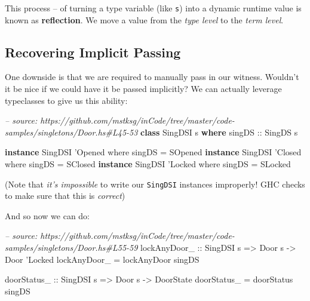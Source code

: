 \documentclass[]{article}
\newenvironment{Shaded}{\begin{snugshade}}{\end{snugshade}}
\newcommand{\CharTok}[1]{\textcolor[rgb]{0.31,0.60,0.02}{#1}}
\newcommand{\CommentTok}[1]{\textcolor[rgb]{0.56,0.35,0.01}{\textit{#1}}}
\newcommand{\DataTypeTok}[1]{\textcolor[rgb]{0.13,0.29,0.53}{#1}}
\newcommand{\FunctionTok}[1]{\textcolor[rgb]{0.00,0.00,0.00}{#1}}
\newcommand{\KeywordTok}[1]{\textcolor[rgb]{0.13,0.29,0.53}{\textbf{#1}}}
\newcommand{\NormalTok}[1]{#1}
\newcommand{\OtherTok}[1]{\textcolor[rgb]{0.56,0.35,0.01}{#1}}
\begin{document}
This process -- of turning a type variable (like \texttt{s}) into a dynamic
runtime value is known as \textbf{reflection}. We move a value from the
\emph{type level} to the \emph{term level}.

\hypertarget{recovering-implicit-passing}{%
\subsection{Recovering Implicit Passing}\label{recovering-implicit-passing}}

One downside is that we are required to manually pass in our witness. Wouldn't
it be nice if we could have it be passed implicitly? We can actually leverage
typeclasses to give us this ability:

\begin{Shaded}
\begin{Highlighting}[]
\CommentTok{-- source: https://github.com/mstksg/inCode/tree/master/code-samples/singletons/Door.hs#L45-53}
\KeywordTok{class} \DataTypeTok{SingDSI}\NormalTok{ s }\KeywordTok{where}
\OtherTok{    singDS ::} \DataTypeTok{SingDS}\NormalTok{ s}

\KeywordTok{instance} \DataTypeTok{SingDSI} \CharTok{'Opened where}
\NormalTok{    singDS }\FunctionTok{=} \DataTypeTok{SOpened}
\KeywordTok{instance} \DataTypeTok{SingDSI} \CharTok{'Closed where}
\NormalTok{    singDS }\FunctionTok{=} \DataTypeTok{SClosed}
\KeywordTok{instance} \DataTypeTok{SingDSI} \CharTok{'Locked where}
\NormalTok{    singDS }\FunctionTok{=} \DataTypeTok{SLocked}
\end{Highlighting}
\end{Shaded}

(Note that \emph{it's impossible} to write our \texttt{SingDSI} instances
improperly! GHC checks to make sure that this is \emph{correct})

And so now we can do:

\begin{Shaded}
\begin{Highlighting}[]
\CommentTok{-- source: https://github.com/mstksg/inCode/tree/master/code-samples/singletons/Door.hs#L55-59}
\OtherTok{lockAnyDoor_ ::} \DataTypeTok{SingDSI}\NormalTok{ s }\OtherTok{=>} \DataTypeTok{Door}\NormalTok{ s }\OtherTok{->} \DataTypeTok{Door} \CharTok{'Locked}
\NormalTok{lockAnyDoor_ }\FunctionTok{=}\NormalTok{ lockAnyDoor singDS}

\OtherTok{doorStatus_ ::} \DataTypeTok{SingDSI}\NormalTok{ s }\OtherTok{=>} \DataTypeTok{Door}\NormalTok{ s }\OtherTok{->} \DataTypeTok{DoorState}
\NormalTok{doorStatus_ }\FunctionTok{=}\NormalTok{ doorStatus singDS}
\end{Highlighting}
\end{Shaded}
\end{document}
